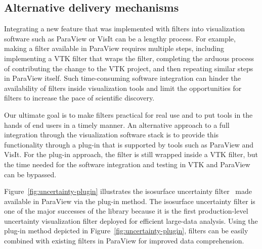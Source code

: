 
\subsection{Alternative delivery mechanisms}


Integrating a new feature that was implemented with \vtkm filters into visualization software such as ParaView or VisIt can be a lengthy process.
For example, making a \vtkm filter available in ParaView requires multiple steps, including implementing a VTK filter that wraps the \vtkm filter, completing the arduous process of contributing the change to the VTK project, and then repeating similar steps in ParaView itself.
Such time-consuming software integration can hinder the availability of \vtkm filters inside visualization tools and limit the opportunities for \vtkm filters to increase the pace of scientific discovery.

Our ultimate goal is to make \vtkm filters practical for real use and to put tools in the hands of end users in a timely manner.
An alternative approach to a full integration through the visualization software stack is to provide this functionality through a plug-in that is supported by tools such as ParaView and VisIt.
For the plug-in approach, the \vtkm filter is still wrapped inside a VTK filter, but the time needed for the software integration and testing in VTK and ParaView can be bypassed.

Figure~\ref{fig:uncertainty-plugin} illustrates the \vtkm isosurface uncertainty filter~\citep{Wang2023, Athawale21} made available in ParaView via the plug-in method. The isosurface uncertainty filter is one of the major successes of the \vtkm library because it is the first production-level uncertainty visualization filter deployed for efficient large-data analysis. Using the plug-in method depicted in Figure~\ref{fig:uncertainty-plugin}, \vtkm filters can be easily combined with existing filters in ParaView for improved data comprehension.



